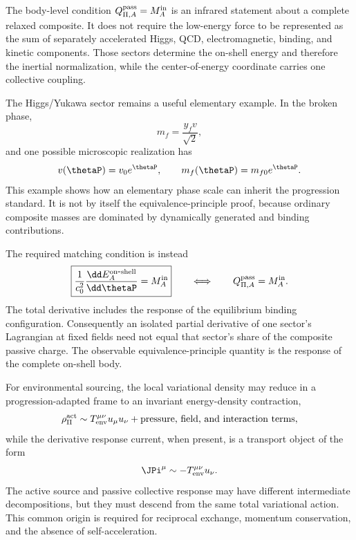 \documentclass[12pt]{article}
\begin{document}
The body-level condition \(Q_{\Pi,A}^{\rm pass}=M_A^{\rm in}\) is an infrared statement about a complete relaxed composite.  It does not require the low-energy force to be represented as the sum of separately accelerated Higgs, QCD, electromagnetic, binding, and kinetic components.  Those sectors determine the on-shell energy and therefore the inertial normalization, while the center-of-energy coordinate carries one collective coupling.

The Higgs/Yukawa sector remains a useful elementary example.  In the broken phase,
\begin{equation}
    m_f=\frac{y_fv}{\sqrt2},
    \label{eq:fermion-mass-normalized}
\end{equation}
and one possible microscopic realization has
\begin{equation}
    v(\thetaP)=v_0e^{\thetaP},
    \qquad
    m_f(\thetaP)=m_{f0}e^{\thetaP}.
    \label{eq:normalized-higgs-loading}
\end{equation}
This example shows how an elementary phase scale can inherit the progression standard.  It is not by itself the equivalence-principle proof, because ordinary composite masses are dominated by dynamically generated and binding contributions.

The required matching condition is instead
\begin{equation}
    \boxed{
    \frac{1}{c_0^2}
    \frac{\dd E_A^{\rm on\mbox{-}shell}}{\dd\thetaP}
    =M_A^{\rm in}}
    \qquad\Longleftrightarrow\qquad
    Q_{\Pi,A}^{\rm pass}=M_A^{\rm in}.
    \label{eq:normalized-full-inertial-loading}
\end{equation}
The total derivative includes the response of the equilibrium binding configuration.  Consequently an isolated partial derivative of one sector's Lagrangian at fixed fields need not equal that sector's share of the composite passive charge.  The observable equivalence-principle quantity is the response of the complete on-shell body.

For environmental sourcing, the local variational density may reduce in a progression-adapted frame to an invariant energy-density contraction,
\begin{equation}
    \rho_\Pi^{\rm act}\sim T_{\rm env}^{\mu\nu}u_\mu u_\nu
    +\text{pressure, field, and interaction terms},
    \label{eq:normalized-theta-response-energy-density}
\end{equation}
while the derivative response current, when present, is a transport object of the form
\begin{equation}
    \JPi^\mu\sim -T_{\rm env}^{\mu\nu}u_\nu .
    \label{eq:normalized-stress-current-sign}
\end{equation}
The active source and passive collective response may have different intermediate decompositions, but they must descend from the same total variational action.  This common origin is required for reciprocal exchange, momentum conservation, and the absence of self-acceleration.
\end{document}
